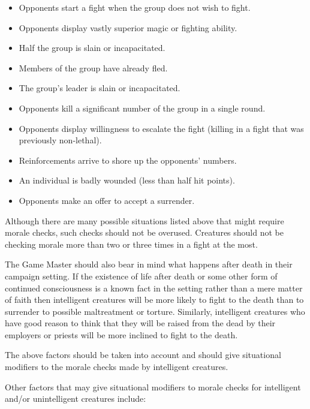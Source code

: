 \begin{multicols*}{2}
\begin{itemize}
	\item{Opponents start a fight when the group does not wish to fight.}
	\item{Opponents display vastly superior magic or fighting ability.}
	\item{Half the group is slain or incapacitated.}
	\item{Members of the group have already fled.}
	\item{The group’s leader is slain or incapacitated.}
	\item{Opponents kill a significant number of the group in a single round.}
	\item{Opponents display willingness to escalate the fight (killing in a fight that was previously non-lethal).}
	\item{Reinforcements arrive to shore up the opponents’ numbers.}
	\item{An individual is badly wounded (less than half hit points).}
	\item{Opponents make an offer to accept a surrender.}
\end{itemize}
Although there are many possible situations listed above that might require morale checks, such checks should not be overused. Creatures should not be checking morale more than two or three times in a fight at the most.

The Game Master should also bear in mind what happens after death in their campaign setting. If the existence of life after death or some other form of continued consciousness is a known fact in the setting rather than a mere matter of faith then intelligent creatures will be more likely to fight to the death than to surrender to possible maltreatment or torture. Similarly, intelligent creatures who have good reason to think that they will be raised from the dead by their employers or priests will be more inclined to fight to the death.

The above factors should be taken into account and should give situational modifiers to the morale checks made by intelligent creatures.

Other factors that may give situational modifiers to morale checks for intelligent and/or unintelligent creatures include:


\end{multicols*}

